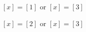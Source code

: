 %
%
%
%
%
%
%


\begin{multicols}{2}
\begin{list}{\bf{\ref{exer:sec74-3}.}}
\item \begin{list}{\bf{(a)}}
\item $[ x ] = [ 1 ]$ or $[ x ] = [ 3 ]$ \qquad 
\end{list}
\end{list}

\begin{list}{}
\item \begin{list}{\bf{(e)}}
\item $[ x ] = [ 2 ]$ or $[ x ] = [ 3 ]$
\end{list}
\end{list}
\end{multicols}

